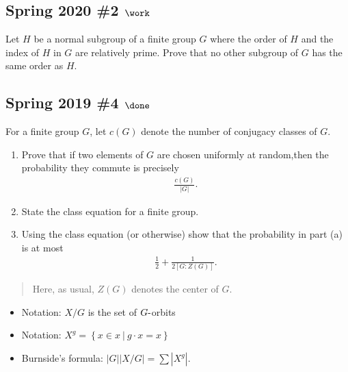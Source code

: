 \hypertarget{spring-2020-2-work}{%
\subsection{\texorpdfstring{Spring 2020 \#2
\(\work\)}{Spring 2020 \#2 \textbackslash work}}\label{spring-2020-2-work}}

Let \(H\) be a normal subgroup of a finite group \(G\) where the order
of \(H\) and the index of \(H\) in \(G\) are relatively prime. Prove
that no other subgroup of \(G\) has the same order as \(H\).

\hypertarget{spring-2019-4-done}{%
\subsection{\texorpdfstring{Spring 2019 \#4
\(\done\)}{Spring 2019 \#4 \textbackslash done}}\label{spring-2019-4-done}}

For a finite group \(G\), let \(c(G)\) denote the number of conjugacy
classes of \(G\).

\begin{enumerate}
\def\labelenumi{\alph{enumi}.}
\item
  Prove that if two elements of \(G\) are chosen uniformly at
  random,then the probability they commute is precisely
  \begin{align*}
  \frac{c(G)}{{\left\lvert {G} \right\rvert}}
  .\end{align*}
\item
  State the class equation for a finite group.
\item
  Using the class equation (or otherwise) show that the probability in
  part (a) is at most
  \begin{align*}
  \frac 1 2 + \frac 1 {2[G : Z(G)]}
  .\end{align*}
\end{enumerate}

\begin{quote}
Here, as usual, \(Z(G)\) denotes the center of \(G\).
\end{quote}

\begin{concept}

\envlist

\begin{itemize}
\tightlist
\item
  Notation: \(X/G\) is the set of \(G{\hbox{-}}\)orbits
\item
  Notation:
  \(X^g = \left\{{x\in x{~\mathrel{\Big|}~}g\cdot x = x}\right\}\)
\item
  Burnside's formula:
  \({\left\lvert {G} \right\rvert} {\left\lvert {X/G} \right\rvert} = \sum {\left\lvert {X^g} \right\rvert}\).
\end{itemize}

\end{concept}

